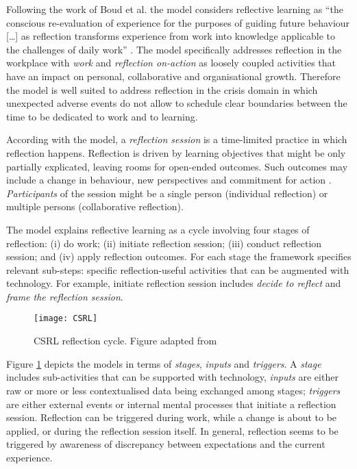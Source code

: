 Following the work of Boud et al. \autocite*{boud1985reflection} the model considers reflective learning as ``the conscious re-evaluation of experience for the purposes of guiding future behaviour {[}\ldots{}{]} as reflection transforms experience from work into knowledge applicable to the challenges of daily work'' \autocite{Krogstie:2013kf}. The model specifically addresses reflection in the workplace with \emph{work} and \emph{reflection on-action} as loosely coupled activities that have an impact on personal, collaborative and organisational growth. Therefore the model is well suited to address reflection in the crisis domain in which unexpected adverse events do not allow to schedule clear boundaries between the time to be dedicated to work and to learning.

According with the model, a \emph{reflection session} is a time-limited practice in which reflection happens. Reflection is driven by learning objectives that might be only partially explicated, leaving rooms for open-ended outcomes. Such outcomes may include a change in behaviour, new perspectives and commitment for action \autocite{boud1985reflection}. \emph{Participants} of the session might be a single person (individual reflection) or multiple persons (collaborative reflection).

The model explains reflective learning as a cycle involving four stages of reflection: (i) do work; (ii) initiate reflection session; (iii) conduct reflection session; and (iv) apply reflection outcomes. For each stage the framework specifies relevant sub-steps: specific reflection-useful activities that can be augmented with technology. For example, initiate reflection session includes \emph{decide to reflect} and \emph{frame the reflection session}.
\begin{figure}
	[tbh] \centering 
	\texttt{[image: CSRL]} \caption{CSRL reflection cycle. Figure adapted from \protect\autocite{Krogstie:2013kf}} \label{fig:csrl-model} 
\end{figure}

Figure \ref{fig:csrl-model} depicts the models in terms of \emph{stages}, \emph{inputs} and \emph{triggers}. A \emph{stage} includes sub-activities that can be supported with technology, \emph{inputs} are either raw or more or less contextualised data being exchanged among stages; \emph{triggers} are either external events or internal mental processes that initiate a reflection session. Reflection can be triggered during work, while a change is about to be applied, or during the reflection session itself. In general, reflection seems to be triggered by awareness of discrepancy between expectations and the current experience.

